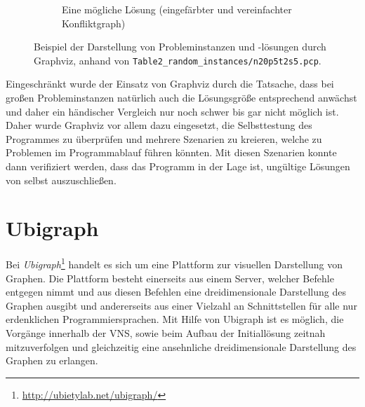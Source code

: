 \begin{figure}
\begin{subfigure}[t]{0.45\textwidth}
		\caption{Eine mögliche Lösung (eingefärbter und vereinfachter Konfliktgraph)}
		\label{fig:graphviz:post}
	\end{subfigure}
	\label{fig:graphviz}
	\caption{Beispiel der Darstellung von Probleminstanzen und -lösungen durch Graphviz, anhand von \texttt{Table2\_random\_instances/n20p5t2s5.pcp}.}
\end{figure}

Eingeschränkt wurde der Einsatz von Graphviz durch die Tatsache, dass bei großen Pro\-blem\-in\-stan\-zen natürlich auch die Lösungsgröße entsprechend anwächst und daher ein hän\-disch\-er Vergleich nur noch schwer bis gar nicht möglich
ist. Daher wurde Graphviz vor allem dazu eingesetzt, die Selbsttestung des Programmes zu überprüfen und mehrere Szenarien zu kreieren, welche zu Problemen im Programmablauf führen könnten. Mit diesen Szenarien
kon\-nte dann verifiziert werden, dass das Programm in der Lage ist, ungültige Lösungen von selbst auszuschließen.


\section{Ubigraph}
\label{sec:ubigraph}
Bei \textit{Ubigraph}\footnote{\url{http://ubietylab.net/ubigraph/}} handelt es sich um eine Plattform zur visuellen Darstellung von Graphen. Die Plattform besteht einerseits aus einem Server, welcher Befehle entgegen nimmt und aus diesen Befehlen eine 
dreidimensionale Darstellung des Graphen ausgibt und andererseits aus einer Vielzahl an Schnittstellen für alle nur erdenklichen Programmiersprachen. Mit Hilfe von Ubigraph ist es möglich, die
Vorgänge innerhalb der VNS, sowie beim Aufbau der Initiallösung zeitnah mitzuverfolgen und gleichzeitig eine ansehnliche dreidimensionale Darstellung des Graphen zu erlangen.

